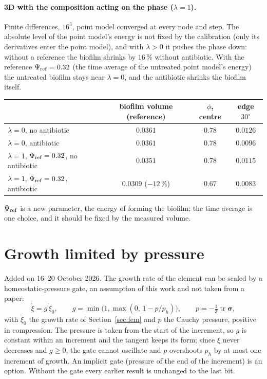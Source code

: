 \documentclass[11pt,a4paper]{article}
\begin{document}
\paragraph{3D with the composition acting on the phase ($\lambda=1$).} Finite differences, $16^3$,
point model converged at every node and step. The absolute level of the point model's energy is
not fixed by the calibration (only its derivatives enter the point model), and with $\lambda>0$
it pushes the phase down: without a reference the biofilm shrinks by $16\,\%$ without antibiotic.
With the reference $\Psi_{\rm ref}=0.32$ (the time average of the untreated point model's energy)
the untreated biofilm stays near $\lambda=0$, and the antibiotic shrinks the biofilm itself.
\begin{center}\small
\begin{tabularx}{\linewidth}{@{}Yccc@{}}
\toprule
& biofilm volume (reference) & $\phi$, centre & edge $30^\circ$\\
\midrule
$\lambda=0$, no antibiotic & $0.0361$ & $0.78$ & $0.0126$\\
$\lambda=0$, antibiotic & $0.0361$ & $0.78$ & $0.0096$\\
$\lambda=1$, $\Psi_{\rm ref}=0.32$, no antibiotic & $0.0351$ & $0.78$ & $0.0115$\\
$\lambda=1$, $\Psi_{\rm ref}=0.32$, antibiotic & $0.0309$ ($-12\,\%$) & $0.67$ & $0.0083$\\
\bottomrule
\end{tabularx}
\end{center}
$\Psi_{\rm ref}$ is a new parameter, the energy of forming the biofilm; the time average is one
choice, and it should be fixed by the measured volume.

\section{Growth limited by pressure}
\label{sec:homeostatic}

Added on 16--20 October 2026. The growth rate of the element can be scaled by a homeostatic-pressure
gate, an assumption of this work and not taken from a paper:
\begin{equation}
\dot\xi=g\,\dot\xi_0,\qquad g=\min\bigl(1,\max(0,\,1-p/p_h)\bigr),\qquad p=-\tfrac13\operatorname{tr}\boldsymbol\sigma,
\label{eq:gate}
\end{equation}
with $\dot\xi_0$ the growth rate of Section~\ref{sec:fem} and $p$ the Cauchy pressure, positive in
compression. The pressure is taken from the start of the increment, so $g$ is constant within an
increment and the tangent keeps its form; since $\xi$ never decreases and $g\ge0$, the gate cannot
oscillate and $p$ overshoots $p_h$ by at most one increment of growth. An implicit gate (pressure of the
end of the increment) is an option. Without the gate every earlier result is unchanged to the last bit.
\end{document}
